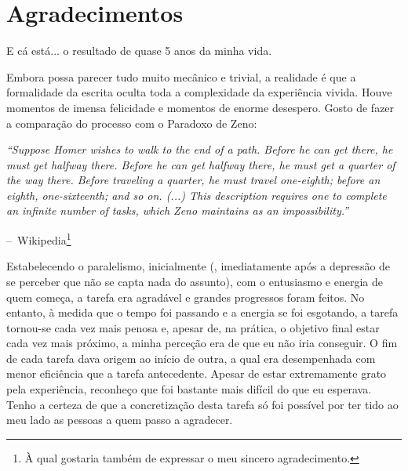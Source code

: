 \makeatletter
\renewcommand{\@chapapp}{}%
\newenvironment{chapquote}[2][2em]
{\setlength{\@tempdima}{#1}%
  \def\chapquote@author{#2}%
  \parshape 1 \@tempdima \dimexpr\textwidth-2\@tempdima\relax%
  \itshape}
{\par\normalfont\hfill--\ \chapquote@author\hspace*{\@tempdima}\par\bigskip}
\makeatother
\setcounter{footnote}{0}
\renewcommand{\BrainFuckChapter}{
  {-}{-}{-}{-}{[}{-}{-}{-}{-}{>}{+}{<}{]}{>}{+}{+}{.}{[}{-}{-}{-}{>}{+}{<}{]}{>}{-}{-}{-}{-}{.}{+}{+}{+}{+}{+}{+}{+}{+}{+}{+}{+}{.}{+}{+}{+}{[}{-}{>}{+}{+}{+}{<}{]}{>}{+}{+}{.}{+}{+}{+}{.}{+}{.}{-}{-}{.}{+}{+}{+}
  {+}{+}{+}{.}{+}{+}{+}{+}{.}{-}{-}{-}{-}{-}{-}{-}{-}{.}{+}{+}{+}{+}{+}{+}{+}{+}{+}{.}{+}{+}{+}{+}{+}{+}{.}{-}{-}{-}{-}{-}{.}{+}{+}{+}{+}{.}{[}{-}{-}{-}{>}{+}{<}{]}{-}{-}{-}{-}{+}{+}{+}{+}{+}{+}{+}{+}{+}{>}{>}{>}
}
\chapter*{Agradecimentos}
E cá está... o resultado de quase 5 anos da minha vida.

Embora possa parecer tudo muito mecânico e trivial, a realidade é que
a formalidade da escrita oculta toda a complexidade da experiência
vivida.
%
Houve momentos de imensa felicidade e momentos de enorme desespero.
%
Gosto de fazer a comparação do processo com o Paradoxo de Zeno:

\begin{chapquote}{Wikipedia\footnote{À qual gostaria também de expressar o meu sincero agradecimento.}}
  ``Suppose Homer wishes to walk to the end of a path. Before he can
  get there, he must get halfway there. Before he can get halfway
  there, he must get a quarter of the way there. Before traveling a
  quarter, he must travel one-eighth; before an eighth, one-sixteenth;
  and so on.  (...)  This description requires one to complete an
  infinite number of tasks, which Zeno maintains as an
  impossibility.''
\end{chapquote}

Estabelecendo o paralelismo, inicialmente (\ie, imediatamente após a
depressão de se perceber que não se capta nada do assunto), com o
entusiasmo e energia de quem começa, a tarefa era agradável e grandes
progressos foram feitos.
%
No entanto, à medida que o tempo foi passando e a energia se foi
esgotando, a tarefa tornou-se cada vez mais penosa e, apesar de, na
prática, o objetivo final estar cada vez mais próximo, a minha
perceção era de que eu não iria conseguir.
%
O fim de cada tarefa dava origem ao início de outra, a qual era
desempenhada com menor eficiência que a tarefa antecedente.
%
Apesar de estar extremamente grato pela experiência, reconheço que foi
bastante mais difícil do que eu esperava.
%
Tenho a certeza de que a concretização desta tarefa só foi possível
por ter tido ao meu lado as pessoas a quem passo a agradecer.
%


